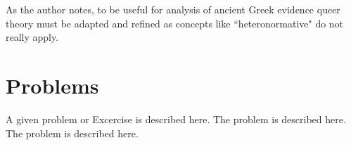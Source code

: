 \begin{nte}
    As the author notes, to be useful for analysis of ancient Greek evidence queer theory must be adapted and refined as concepts like ``heteronormative" do not really apply.
\end{nte}



%
%
%


\section*{Problems}
%
\begin{prob}
\label{prob1}
A given problem or Excercise is described here. The
problem is described here. The problem is described here.
\end{prob}




